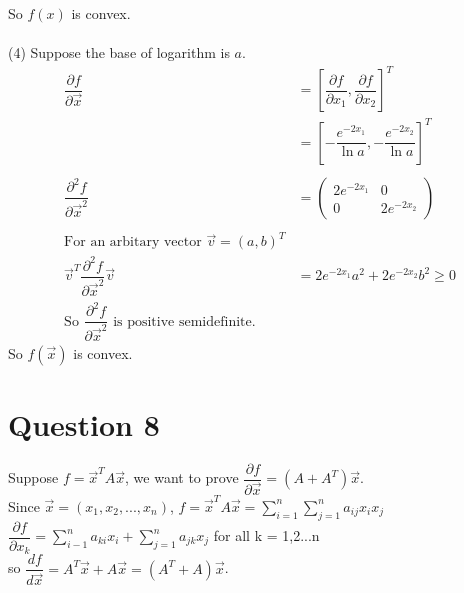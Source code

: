 \documentclass{amsart}
\begin{document}
So $f(x)$ is convex.
\\\\
(4)
Suppose the base of logarithm is $a$.
\begin{align*}
\dfrac{\partial f}{\partial \vec{x}} &= [\dfrac{\partial f}{\partial x_1}, \dfrac{\partial f}{\partial x_2}]^T\\
&= [-\dfrac{e^{-2x_1}}{\ln a}, -\dfrac{e^{-2x_2}}{\ln a}]^T
\\\\
\dfrac{\partial^2 f}{\partial \vec{x}^2} &= \left(
\begin{matrix}
	2e^{-2x_1} & 0 \\
	0 & 2e^{-2x_2}
\end{matrix}
\right)\\
\\\text{For an arbitary vector } \vec{v}=(a,b)^T\\
\vec{v}^T \dfrac{\partial^2 f}{\partial \vec{x}^2} \vec{v} &= 2e^{-2x_1}a^2
 + 2e^{-2x_2}b^2  \ge 0
 \\\text{So } \dfrac{\partial^2 f}{\partial \vec{x}^2} \text{ is positive semidefinite.}
\end{align*}
So $f(\vec{x})$ is convex.
\\
\section{Question 8}
Suppose $f = \vec{x}^TA\vec{x}$, we want to prove $\dfrac{\partial f}{\partial {\vec{x}}}=(A+A^T)\vec{x}$.\\

Since $\vec{x}=(x_1,x_2,...,x_n)$,  $f=\vec{x}^TA\vec{x}=\sum\limits_{i=1}^{n}\sum\limits_{j=1}^{n}a_{ij}x_ix_j$\\

$\dfrac{\partial f}{\partial x_k}=\sum\limits_{i-1}^{n}a_{ki}x_i + \sum\limits_{j=1}^{n}a_{jk}x_j$ for all k = 1,2...n\\

so $\dfrac{df}{d{\vec{x}}}=A^T\vec{x} + A\vec{x} = (A^T+A)\vec{x}$.
\end{document}
